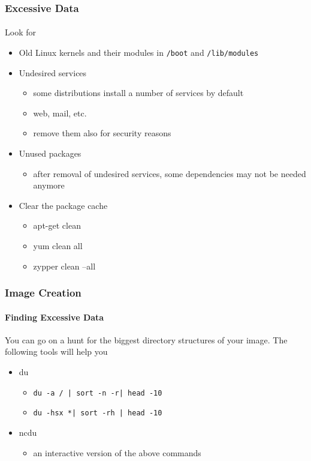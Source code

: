 \begin{frame}
\frametitle{Excessive Data}
\framesubtitle{}
Look for
\begin{itemize}
\item Old Linux kernels and their modules in \texttt{/boot} and
  \texttt{/lib/modules}
\item Undesired services
  \begin{itemize}
  \item some distributions install a number of services by default
  \item web, mail, etc.
  \item remove them also for security reasons
  \end{itemize}
\item Unused packages
  \begin{itemize}
  \item after removal of undesired services, some dependencies may not
    be needed anymore
  \end{itemize}
\item Clear the package cache
  \begin{itemize}
  \item apt-get clean
  \item yum clean all
  \item zypper clean --all
  \end{itemize}
\end{itemize}
\end{frame}

\begin{frame}[fragile]
\frametitle{Image Creation}
\framesubtitle{Finding Excessive Data}
You can go on a hunt for the biggest directory structures of your image. The following tools will help you
\begin{itemize}
\item du
  \begin{itemize}
  \item \lstinline{du -a / | sort -n -r| head -10}
  \item \lstinline{du -hsx *| sort -rh | head -10}
  \end{itemize}
\item ncdu
  \begin{itemize}
  \item an interactive version of the above commands
  \end{itemize}
\end{itemize}

\end{frame}

